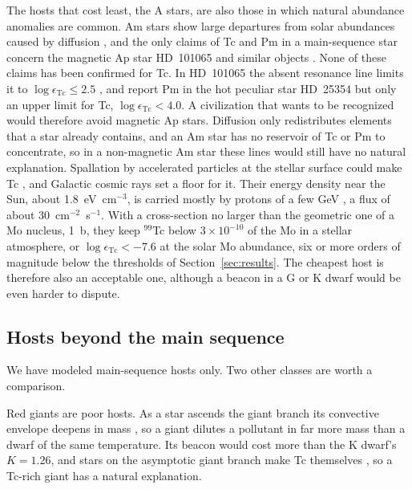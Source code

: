 \documentclass[final,5p]{elsarticle}
\begin{document}
The hosts that cost least, the A stars, are also those in which natural abundance anomalies are common. Am stars show large departures from solar abundances caused by diffusion \citep{Richer2000}, and the only claims of Tc and Pm in a main-sequence star concern the magnetic Ap star HD~101065 \citep{Cowley2000, Cowley2004, Fivet2007, Gopka2008} and similar objects \citep{Yushchenko2024}. None of these claims has been confirmed for Tc. In HD~101065 the absent resonance line limits it to $\log\epsilon_\mathrm{Tc} \leq 2.5$ \citep{Ryabchikova2008, Andrievsky2023tc}, and \citet{Yushchenko2024} report Pm in the hot peculiar star HD~25354 but only an upper limit for Tc, $\log\epsilon_\mathrm{Tc} < 4.0$. A civilization that wants to be recognized would therefore avoid magnetic Ap stars. Diffusion only redistributes elements that a star already contains, and an Am star has no reservoir of Tc or Pm to concentrate, so in a non-magnetic Am star these lines would still have no natural explanation. Spallation by accelerated particles at the stellar surface could make Tc \citep{Goriely2007}, and Galactic cosmic rays set a floor for it. Their energy density near the Sun, about 1.8~eV~cm$^{-3}$, is carried mostly by protons of a few GeV \citep{Ferriere2001}, a flux of about 30~cm$^{-2}$~s$^{-1}$. With a cross-section no larger than the geometric one of a Mo nucleus, 1~b, they keep $^{99}$Tc below $3\times10^{-10}$ of the Mo in a stellar atmosphere, or $\log\epsilon_\mathrm{Tc} < -7.6$ at the solar Mo abundance, six or more orders of magnitude below the thresholds of Section~\ref{sec:results}. The cheapest host is therefore also an acceptable one, although a beacon in a G or K dwarf would be even harder to dispute.

\subsection{Hosts beyond the main sequence}
\label{sec:wd}

We have modeled main-sequence hosts only. Two other classes are worth a comparison.

Red giants are poor hosts. As a star ascends the giant branch its convective envelope deepens in mass \citep{Karakas2014}, so a giant dilutes a pollutant in far more mass than a dwarf of the same temperature. Its beacon would cost more than the K dwarf's $K = 1.26$, and stars on the asymptotic giant branch make Tc themselves \citep{Merrill1952, Shetye2022}, so a Tc-rich giant has a natural explanation.
\end{document}
